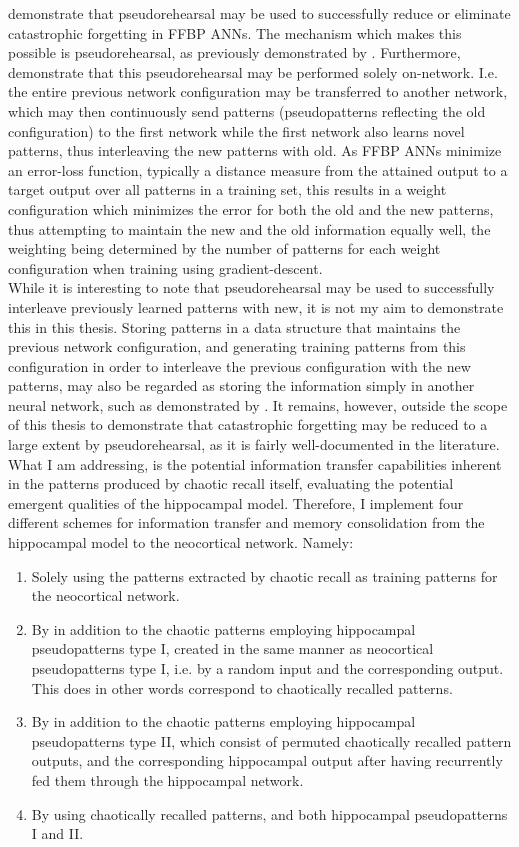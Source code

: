 \cite{Ans1997} demonstrate that pseudorehearsal may be used to successfully reduce or eliminate catastrophic forgetting in FFBP ANNs. The mechanism which makes this possible is pseudorehearsal, as previously demonstrated by \cite{Robins1995}. Furthermore, \cite{Ans1997} demonstrate that this pseudorehearsal may be performed solely on-network. I.e. the entire previous network configuration may be transferred to another network, which may then continuously send patterns (pseudopatterns reflecting the old configuration) to the first network while the first network also learns novel patterns, thus interleaving the new patterns with old. As FFBP ANNs minimize an error-loss function, typically a distance measure from the attained output to a target output over all patterns in a training set, this results in a weight configuration which minimizes the error for both the old and the new patterns, thus attempting to maintain the new and the old information equally well, the weighting being determined by the number of patterns for each weight configuration when training using gradient-descent.
\\

While it is interesting to note that pseudorehearsal may be used to successfully interleave previously learned patterns with new, it is not my aim to demonstrate this in this thesis.
Storing patterns in a data structure that maintains the previous network configuration, and generating training patterns from this configuration in order to interleave the previous configuration with the new patterns, may also be regarded as storing the information simply in another neural network, such as demonstrated by \cite{French1997}. It remains, however, outside the scope of this thesis to demonstrate that catastrophic forgetting may be reduced to a large extent by pseudorehearsal, as it is fairly well-documented in the literature. 
What I am addressing, is the potential information transfer capabilities inherent in the patterns produced by chaotic recall itself, evaluating the potential emergent qualities of the hippocampal model. Therefore, I implement four different schemes for information transfer and memory consolidation from the hippocampal model to the neocortical network. Namely:

\begin{enumerate}
    \item Solely using the patterns extracted by chaotic recall as training patterns for the neocortical network.
    \item By in addition to the chaotic patterns employing hippocampal pseudopatterns type I, created in the same manner as neocortical pseudopatterns type I, i.e. by a random input and the corresponding output. This does in other words correspond to chaotically recalled patterns.
    \item By in addition to the chaotic patterns employing hippocampal pseudopatterns type II, which consist of permuted chaotically recalled pattern outputs, and the corresponding hippocampal output after having recurrently fed them through the hippocampal network.
    \item By using chaotically recalled patterns, and both hippocampal pseudopatterns I and II.
\end{enumerate}



